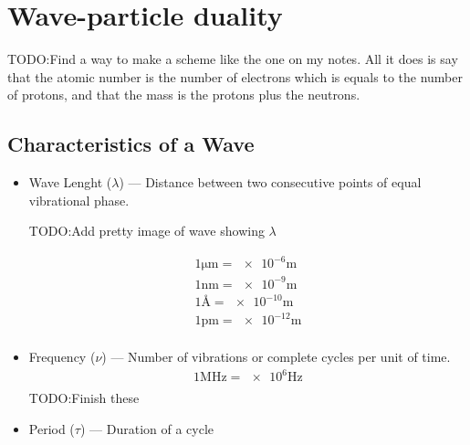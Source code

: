 \documentclass{article}[10pt]
\begin{document}
\section{Wave-particle duality}
TODO:\@ Find a way to make a scheme like the one on my notes. All it does is say
that the atomic number is the number of electrons which is equals to the number
of protons, and that the mass is the protons plus the neutrons.


\subsection{Characteristics of a Wave}
\begin{itemize}
    \item Wave Lenght ($\lambda$) --- Distance between two consecutive points of
          equal vibrational phase.

          TODO:\@ Add pretty image of wave showing $\lambda$

          \begin{align*}
              1\si{\micro\metre} = \num{e-6}\si{\metre} \\[0.5em]
              1\si{\nano\metre} = \num{e-9}\si{\metre}  \\[0.5em]
              1\si{\angstrom} = \num{e-10}\si{\metre}   \\[0.5em]
              1\si{\pico\metre} = \num{e-12}\si{\metre} \\[0.5em]
          \end{align*}
    \item Frequency ($\nu$) --- Number of vibrations or complete cycles per
          unit of time.
          \begin{align*}
              1\si{\mega\hertz} = \num{e6}\si{\hertz} \\[0.5em]
          \end{align*}
          TODO:\@ Finish these
    \item Period ($\tau$) --- Duration of a cycle
\end{itemize}
\end{document}
